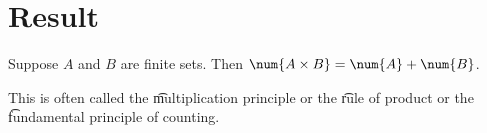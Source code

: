 

\blankpage
\section*{Result}

\begin{proposition}
Suppose $A$ and $B$ are finite sets.
Then $\num{A \times  B} = \num{A} + \num{B}$.
\end{proposition}

This is often called the \t{multiplication principle} or the \t{rule of product} or the \t{fundamental principle of counting}.
\blankpage